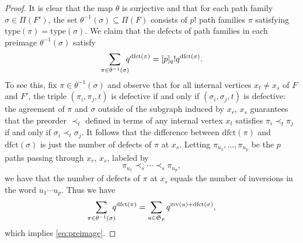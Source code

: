 \documentclass[12pt]{amsart}
\theoremstyle{definition}
\numberwithin{equation}{section}
\newcommand{\mfs}[1]{\mathfrak{S}_{#1}}
\newcommand{\inv}{\textsc{inv}}
\newcommand{\dfct}{\mathrm{dfct}}
\newcommand{\ctr}[1]{{x}_{#1}}
\newcommand{\type}{\mathrm{type}}
\newcommand{\nTksp}{\negthickspace\negthickspace}
\begin{document}
\begin{proof}
             It is clear that 
             the map $\theta$ is surjective and that 
             for each path family $\sigma \in \Pi(F')$, 
        the set $\theta^{-1}(\sigma) \subseteq \Pi(F)$ consists of $p!$ path families $\pi$ satisfying $\type(\pi) =  \type(\sigma)$.
        We claim that the defects of
            path families in each preimage $\theta^{-1}(\sigma)$ satisfy
    \begin{equation}\label{eq:preimage}
        \sum_{\pi \in \theta^{-1}(\sigma)} 
        \nTksp q^{\dfct(\pi)} = [p]_q! q^{\dfct(\sigma)} .
    \end{equation}
    To see this, fix $\pi \in \theta^{-1}(\sigma)$ and observe that for all internal vertices $\ctr t \neq \ctr s$ of $F$ and $F'$, the triple $(\pi_i, \pi_j,  t)$ is defective if and only if $(\sigma_i, \sigma_j, t)$ is defective:
    the agreement of $\pi$ and $\sigma$ outside of the subgraph induced by $\ctr r$, $\ctr s$ guarantees that
    the preorder $\prec_t$ defined in terms of any internal vertex $\ctr t$ satisfies
    $\pi_i \prec_t \pi_j$ if and only if $\sigma_i \prec_t \sigma_j$. It follows that the difference between $\dfct(\pi)$ and
    $\dfct(\sigma)$ is just the number of defects of $\pi$ at $\ctr s$.
    Letting $\pi_{u_1}, \dotsc, \pi_{u_p}$ be the $p$ paths passing through $\ctr r$, $\ctr s$, labeled by
    \begin{equation*}
        \pi_{u_1} \prec_s \cdots \prec_s \pi_{u_p},
    \end{equation*}
we have that the number of defects of $\pi$ at $\ctr s$ 
equals the number of inversions in the word $u_1 \cdots u_p$.
Thus we have
\begin{equation*}
\sum_{\pi \in \theta^{-1}(\sigma)} \nTksp q^{\dfct(\pi)} = 
\sum_{u \in \mfs p} q^{\inv(u) + \dfct(\sigma)},
\end{equation*}
which implies \eqref{eq:preimage}.


\end{proof}
\end{document}
